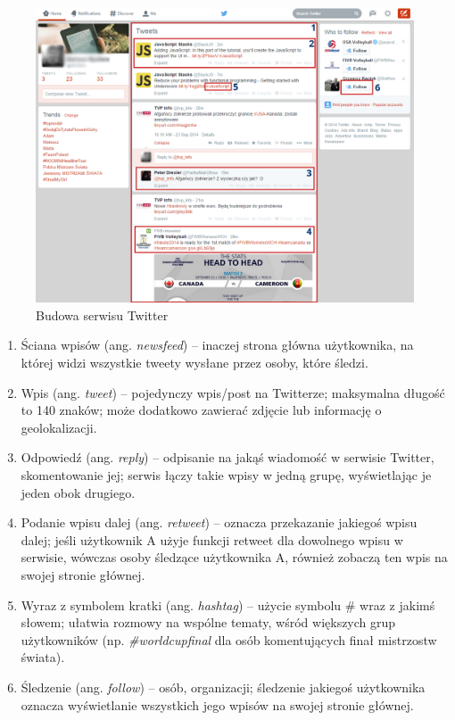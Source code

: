 \begin{figure}[ht!]
\centering
\includegraphics[width=160mm]{img/twitter-screen2.png}
\caption{Budowa serwisu Twitter}
\label{image:twitter-screen}
\end{figure}

\begin{enumerate}
  \item Ściana wpisów (ang. \textit{newsfeed}) -- inaczej strona główna 
  użytkownika, na której widzi wszystkie tweety wysłane przez osoby, które śledzi.
  
  \item Wpis (ang. \textit{tweet}) -- pojedynczy wpis/post na Twitterze; 
  maksymalna długość to 140 znaków; może dodatkowo zawierać zdjęcie lub 
  informację o geolokalizacji.

  \item Odpowiedź (ang. \textit{reply}) -- odpisanie na jakąś wiadomość w serwisie
  Twitter, skomentowanie jej; serwis łączy takie wpisy w jedną grupę, wyświetlając
  je jeden obok drugiego.
  
  \item Podanie wpisu dalej (ang. \textit{retweet}) -- oznacza przekazanie 
  jakiegoś wpisu dalej; jeśli użytkownik A użyje funkcji
  retweet dla dowolnego wpisu w serwisie, wówczas osoby śledzące użytkownika A, 
  również zobaczą ten wpis na swojej stronie głównej.
  
  \item Wyraz z symbolem kratki (ang. \textit{hashtag}) -- użycie symbolu \# 
  wraz z jakimś słowem; ułatwia rozmowy na wspólne tematy, wśród większych grup
  użytkowników (np. \textit{\#worldcupfinal} dla osób komentujących finał 
  mistrzostw świata).

  \item Śledzenie (ang. \textit{follow}) -- osób, organizacji; śledzenie 
  jakiegoś użytkownika oznacza wyświetlanie wszystkich jego wpisów na swojej 
  stronie głównej.
\end{enumerate} 

